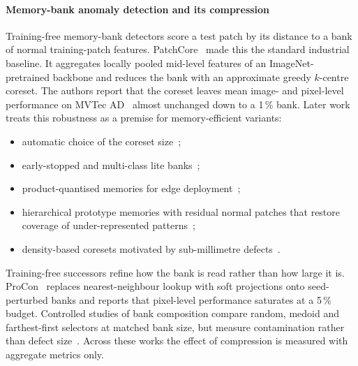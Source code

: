 \documentclass[preprint,review,12pt]{elsarticle}
\begin{document}
\paragraph{Memory-bank anomaly detection and its compression}
Training-free memory-bank detectors score a test patch by its distance to a
bank of normal training-patch features. PatchCore~\citep{roth2022patchcore}
made this the standard industrial baseline. It aggregates locally pooled
mid-level features of an ImageNet-pretrained backbone and reduces the bank
with an approximate greedy $k$-centre coreset. The authors report that the
coreset leaves mean image- and pixel-level performance on MVTec
AD~\citep{bergmann2019mvtec,bergmann2021mvtec} almost unchanged down to a
1\,\% bank. Later work treats this robustness as a premise for
memory-efficient variants:
\begin{itemize}
\item automatic choice of the coreset size~\citep{kamiya2026aso};
\item early-stopped and multi-class lite banks~\citep{lardon2026lite};
\item product-quantised memories for edge deployment~\citep{stropeni2026edge};
\item hierarchical prototype memories with residual normal patches that
restore coverage of under-represented patterns~\citep{feng2026hrpro};
\item density-based coresets motivated by sub-millimetre
defects~\citep{deng2026cpdpatchcore}.
\end{itemize}
Training-free successors refine how the bank is read rather than how large
it is. ProCon~\citep{chae2026procon} replaces nearest-neighbour lookup with
soft projections onto seed-perturbed banks and reports that pixel-level
performance saturates at a 5\,\% budget. Controlled studies of bank
composition compare random, medoid and farthest-first selectors at matched
bank size, but measure contamination rather than defect
size~\citep{chae2026memorycomposition}. Across these works the effect of
compression is measured with aggregate metrics only.
\end{document}
